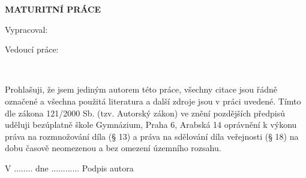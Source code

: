 
\pagestyle{empty}
\hypersetup{pageanchor=false}

\begin{center}

{\LARGE\bfseries\NazevSkoly}

\vspace{-18mm}
\vfill

{\LARGE\NazevOboru}

\vfill

\centerline{\mbox{\def\svgwidth{\columnwidth}\scalebox{0.25}{}}}

\vspace{-8mm}
\vfill

{\bf\Large MATURITNÍ PRÁCE}

\vfill


\vspace{15mm}

{\LARGE\bfseries\NazevPrace}


\vfill


Vypracoval: \hfill \AutorPrace

Vedoucí práce: \hfill \Vedouci

\vspace{15mm}
\MesicOdevzdani \ \RokOdevzdani

\end{center}



\newpage
\hypersetup{pageanchor=true}
\pagestyle{plain}


\openright


\vspace*{\fill}


\noindent
Prohlašuji, že jsem jediným autorem této práce, všechny citace jsou
řádně označené a všechna použitá literatura a další zdroje jsou v práci uvedené.
Tímto dle zákona 121/2000 Sb. (tzv. Autorský zákon) ve znění pozdějších předpisů uděluji
bezúplatně škole Gymnázium, Praha 6, Arabská 14 oprávnění k výkonu práva na rozmnožování díla
(§ 13) a práva na sdělování díla veřejnosti (§ 18) na dobu časově neomezenou a bez omezení
územního rozsahu.


\vspace{1cm}

\noindent
V ........ dne ............
\hspace{4cm}
Podpis autora


\newpage


\openright

